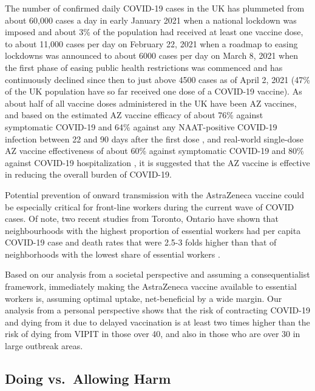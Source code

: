 \documentclass[]{interact}
\theoremstyle{plain}%
\theoremstyle{definition}
\theoremstyle{remark}
\begin{document}
The number of confirmed daily COVID-19 cases in the UK has plummeted
from about 60,000 cases a day in early January 2021 when a national
lockdown was imposed and about 3\% of the population had received at
least one vaccine dose, to about 11,000 cases per day on February 22,
2021 when a roadmap to easing lockdowns was announced to about 6000
cases per day on March 8, 2021 when the first phase of easing public
health restrictions was commenced \citep{bbc_lockdown_2021} and has
continuously declined since then to just above 4500 cases as of April 2,
2021 (47\% of the UK population have so far received one dose of a
COVID-19 vaccine). As about half of all vaccine doses administered in
the UK have been AZ vaccines, and based on the estimated AZ vaccine
efficacy of about 76\% against symptomatic COVID-19 and 64\% against any
NAAT-positive COVID-19 infection between 22 and 90 days after the first
dose \citep{voysey_single-dose_2021}, and real-world single-dose AZ
vaccine effectiveness of about 60\% against symptomatic COVID-19 and
80\% against COVID-19 hospitalization
\citep{public_health_england_1public_2021}, it is suggested that the AZ
vaccine is effective in reducing the overall burden of COVID-19.

Potential prevention of onward transmission with the AstraZeneca vaccine
could be especially critical for front-line workers during the current
wave of COVID cases. Of note, two recent studies from Toronto, Ontario
have shown that neighbourhoods with the highest proportion of essential
workers had per capita COVID-19 case and death rates that were 2.5-3
folds higher than that of neighborhoods with the lowest share of
essential workers
\citep[\citet{rao_disproportionate_2021}]{chagla_characterizing_2021}.

Based on our analysis from a societal perspective and assuming a
consequentialist framework, immediately making the AstraZeneca vaccine
available to essential workers is, assuming optimal uptake,
net-beneficial by a wide margin. Our analysis from a personal
perspective shows that the risk of contracting COVID-19 and dying from
it due to delayed vaccination is at least two times higher than the risk
of dying from VIPIT in those over 40, and also in those who are over 30
in large outbreak areas.

\hypertarget{doing-vs.-allowing-harm}{%
\subsection{Doing vs.~Allowing Harm}\label{doing-vs.-allowing-harm}}
\end{document}
